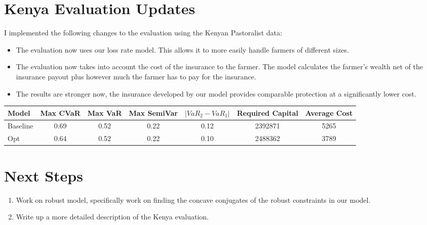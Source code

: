 \documentclass[11pt]{article}
\begin{document}
\section{Kenya Evaluation Updates}
  I implemented the following changes to the evaluation using the Kenyan Pastoralist data: 
  \begin{itemize}
    \item The evaluation now uses our loss rate model. This allows it to more easily handle farmers of different sizes. 
    \item The evaluation now takes into account the cost of the insurance to the farmer. The model calculates the farmer's wealth net of the insurance payout plus however much the farmer has to pay for the insurance. 
    \item The results are stronger now, the insurance developed by our model provides comparable protection at a significantly lower cost. 
  \end{itemize}

\begin{table}[H]
  \centering 
  \begin{tabular}{lcccccc}
    \toprule
       Model &  Max CVaR &  Max VaR &  Max SemiVar &  $|VaR_2 - VaR_1|$ &  Required Capital &  Average Cost \\
    \midrule
    Baseline &         0.69 &        0.52 &            0.22 &                  0.12 &           2392871 &          5265 \\
         Opt &         0.64 &        0.52 &            0.22 &            0.10     &           2488362 &          3789 \\
    \bottomrule
    \end{tabular}
\end{table}

\section{Next Steps}
\begin{enumerate}
  \item Work on robust model, specifically work on finding the concave conjugates of the robust constraints in our model. 
  \item Write up a more detailed description of the Kenya evaluation. 
\end{enumerate}
\end{document}
